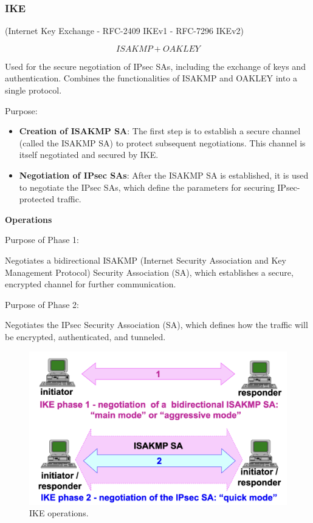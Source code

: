 \subsubsection{IKE}
\begin{center}
    (Internet Key Exchange - RFC-2409 IKEv1 - RFC-7296 IKEv2)
\end{center}
\[
ISAKMP + OAKLEY
\]

Used for the secure negotiation of IPsec SAs, including the exchange of keys and authentication. Combines the functionalities of ISAKMP and OAKLEY into a single protocol.

Purpose:
\begin{itemize}
\item \textbf{Creation of ISAKMP SA}: The first step is to establish a secure channel (called the ISAKMP SA) to protect subsequent negotiations. This channel is itself negotiated and secured by IKE.
\item \textbf{Negotiation of IPsec SAs}: After the ISAKMP SA is established, it is used to negotiate the IPsec SAs, which define the parameters for securing IPsec-protected traffic.
\end{itemize}

\hfill

\textbf{Operations}

\hfill

Purpose of Phase 1:

\begin{center}
    Negotiates a bidirectional ISAKMP (Internet Security Association and Key Management Protocol) Security Association (SA), which establishes a secure, encrypted channel for further communication.
\end{center}
Purpose of Phase 2:
\begin{center}
    Negotiates the IPsec Security Association (SA), which defines how the traffic will be encrypted, authenticated, and tunneled.
\end{center}

\begin{figure}[H]
  \includegraphics[width=\linewidth]{Images/NetSec/ike_operations.png}
  \caption{IKE operations.}
\end{figure}

